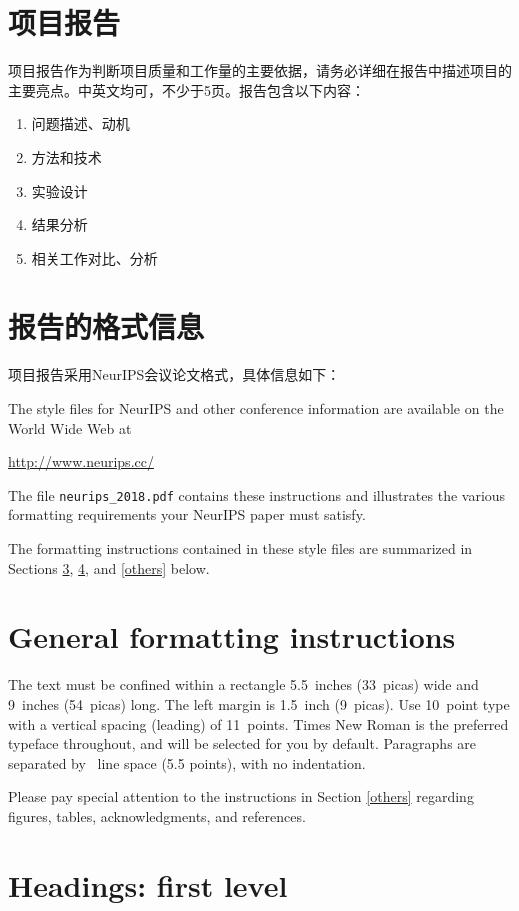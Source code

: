 \documentclass{article}
\begin{document}
\section{项目报告}
 项目报告作为判断项目质量和工作量的主要依据，请务必详细在报告中描述项目的主要亮点。中英文均可，不少于5页。报告包含以下内容：
\begin{enumerate}
    \item 问题描述、动机
    \item 方法和技术
    \item 实验设计
    \item 结果分析
    \item 相关工作对比、分析
\end{enumerate}


\section{报告的格式信息}
项目报告采用NeurIPS会议论文格式，具体信息如下：

The style files for NeurIPS and other conference information are available on
the World Wide Web at
\begin{center}
  \url{http://www.neurips.cc/}
\end{center}
The file \verb+neurips_2018.pdf+ contains these instructions and illustrates the
various formatting requirements your NeurIPS paper must satisfy.

The formatting instructions contained in these style files are summarized in
Sections \ref{gen_inst}, \ref{headings}, and \ref{others} below.

\section{General formatting instructions}
\label{gen_inst}

The text must be confined within a rectangle 5.5~inches (33~picas) wide and
9~inches (54~picas) long. The left margin is 1.5~inch (9~picas).  Use 10~point
type with a vertical spacing (leading) of 11~points.  Times New Roman is the
preferred typeface throughout, and will be selected for you by default.
Paragraphs are separated by ~line space (5.5 points), with no
indentation.


Please pay special attention to the instructions in Section \ref{others}
regarding figures, tables, acknowledgments, and references.

\section{Headings: first level}
\label{headings}
\end{document}
